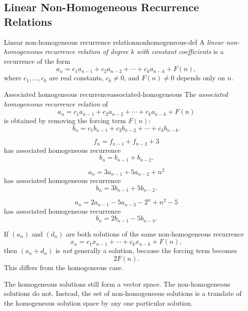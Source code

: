 \subsection{Linear Non-Homogeneous Recurrence Relations}

\begin{definition}{Linear non-homogeneous recurrence relation}{nonhomogeneous-def}
A \emph{linear non-homogeneous recurrence relation of degree \(k\) with constant coefficients} is a recurrence of the form
\[
a_n=c_1a_{n-1}+c_2a_{n-2}+\cdots+c_ka_{n-k}+F(n),
\]
where \(c_1,\dots,c_k\) are real constants, \(c_k\neq 0\), and \(F(n)\neq 0\) depends only on \(n\).
\end{definition}

\begin{definition}{Associated homogeneous recurrence}{associated-homogeneous}
The \emph{associated homogeneous recurrence relation} of
\[
a_n=c_1a_{n-1}+c_2a_{n-2}+\cdots+c_ka_{n-k}+F(n)
\]
is obtained by removing the forcing term \(F(n)\):
\[
b_n=c_1b_{n-1}+c_2b_{n-2}+\cdots+c_kb_{n-k}.
\]
\end{definition}

\begin{examplebox}[title={Examples}]
\[
f_n=f_{n-1}+f_{n-2}+3
\]
has associated homogeneous recurrence
\[
b_n=b_{n-1}+b_{n-2}.
\]

\[
a_n=3a_{n-1}+5a_{n-2}+n^2
\]
has associated homogeneous recurrence
\[
b_n=3b_{n-1}+5b_{n-2}.
\]

\[
a_n=2a_{n-1}-5a_{n-3}-2^n+n^2-5
\]
has associated homogeneous recurrence
\[
b_n=2b_{n-1}-5b_{n-3}.
\]
\end{examplebox}

\begin{commonmistake}[title={Adding two non-homogeneous solutions}]
If \((a_n)\) and \((d_n)\) are both solutions of the same non-homogeneous recurrence
\[
x_n=c_1x_{n-1}+\cdots+c_kx_{n-k}+F(n),
\]
then \((a_n+d_n)\) is \emph{not} generally a solution, because the forcing term becomes
\[
2F(n).
\]
This differs from the homogeneous case.
\end{commonmistake}

\begin{extension}[title={What survives from the homogeneous theory}]
The homogeneous solutions still form a vector space. The non-homogeneous solutions do not. Instead, the set of non-homogeneous solutions is a translate of the homogeneous solution space by any one particular solution.
\end{extension}

